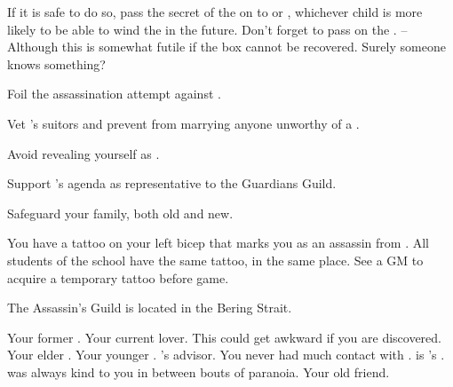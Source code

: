 \documentclass[char]{NeptuneBall}
\begin{document}
\begin{itemz}[Goals]
  \item If it is safe to do so, pass the secret of the \iMusicBox{} on to \cAriel{} or \cPrincess{}, whichever child is more likely to be able to wind the \iMusicBox{} in the future. Don't forget to pass on the \iMusicBoxKey{}. -- Although this is somewhat futile if the box cannot be recovered. Surely someone knows something?
  \item Foil the assassination attempt against \cKing{}.
  \item Vet \cPrincess{}'s suitors and prevent \cPrincess{\them} from marrying anyone unworthy of a \cPrincess{\prince}.
  \item Avoid revealing yourself as \cQueen{\King} \cQueen{}.
	\item Support \cGeneral{}'s agenda as representative to the Guardians Guild.
	\item Safeguard your family, both old and new.
\end{itemz}


\begin{itemz}[Notes]
  \item You have a tattoo on your left bicep that marks you as an assassin from \pAssassin{}. All students of the school have the same tattoo, in the same place. See a GM to acquire a temporary tattoo before game.
\end{itemz}

\begin{itemz}[Trivia]
  \item The Assassin's Guild is located in the Bering Strait.
\end{itemz}

\begin{contacts}
  \contact{\cKing{}} Your former \cKing{\spouse}.
  \contact{\cGeneral{}} Your current lover. This could get awkward if you are discovered.
  \contact{\cAriel{}} Your elder \cAriel{\offspring}.
  \contact{\cPrincess{}} Your younger \cPrincess{{\offspring}}.
  \contact{\cManta{}} \cKing{}'s advisor. You never had much contact with \cManta{\them}.
  \contact{\cPlant{}} \cPlant{} is \cKing{}'s \cPlant{\sibling}. \cPlant{\they} was always kind to you in between bouts of paranoia.
  \contact{\cDiplomat{}} Your old friend.
\end{contacts}
\end{document}
